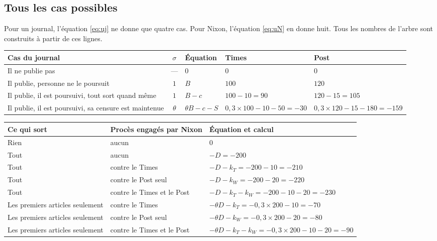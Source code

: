 \documentclass[11pt,a4paper]{article}
\theoremstyle{definition}
\begin{document}
\subsection{Tous les cas possibles}
Pour un journal, l'équation \eqref{eq:uj} ne donne que quatre cas. Pour Nixon, l'équation \eqref{eq:uN} en donne huit. Tous les nombres de l'arbre sont construits à partir de ces lignes.
\begin{center}
\footnotesize
\begin{tabularx}{\textwidth}{@{}>{\raggedright\arraybackslash}Xclll@{}}
\toprule
Cas du journal & $\sigma$ & Équation & Times & Post \\
\midrule
Il ne publie pas & --- & $0$ & $0$ & $0$ \\
Il publie, personne ne le poursuit & $1$ & $B$ & $100$ & $120$ \\
Il publie, il est poursuivi, tout sort quand même & $1$ & $B-c$ & $100-10=90$ & $120-15=105$ \\
Il publie, il est poursuivi, sa censure est maintenue & $\theta$ & $\theta B-c-S$ & $0,3\times100-10-50=-30$ & $0,3\times120-15-180=-159$ \\
\bottomrule
\end{tabularx}

\medskip
\begin{tabular}{@{}lll@{}}
\toprule
Ce qui sort & Procès engagés par Nixon & Équation et calcul \\
\midrule
Rien & aucun & $0$ \\
Tout & aucun & $-D=-200$ \\
Tout & contre le Times & $-D-k_T=-200-10=-210$ \\
Tout & contre le Post seul & $-D-k_W=-200-20=-220$ \\
Tout & contre le Times et le Post & $-D-k_T-k_W=-200-10-20=-230$ \\
Les premiers articles seulement & contre le Times & $-\theta D-k_T=-0,3\times200-10=-70$ \\
Les premiers articles seulement & contre le Post seul & $-\theta D-k_W=-0,3\times200-20=-80$ \\
Les premiers articles seulement & contre le Times et le Post & $-\theta D-k_T-k_W=-0,3\times200-10-20=-90$ \\
\bottomrule
\end{tabular}
\end{center}
\end{document}
